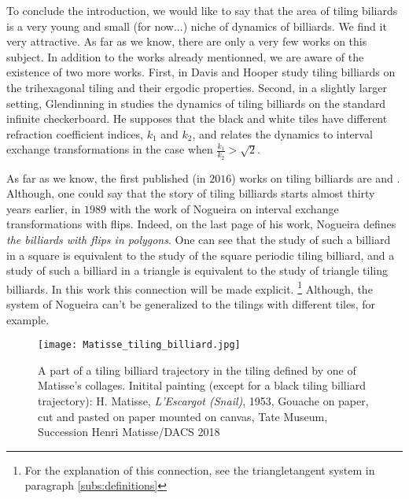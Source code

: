 \documentclass[12pt]{article}
\theoremstyle{definition}
\begin{document}
To conclude the introduction, we would like to say that the area of tiling biliards is a very young and small (for now...) niche of dynamics of billiards. We find it very attractive.
As far as we know, there are only a very few works on this subject. In addition to the works already mentionned, we are aware of the existence of two more works. First, in \cite{DH18} Davis and Hooper study tiling billiards on the trihexagonal tiling and their ergodic properties. Second, in a slightly larger setting, Glendinning in \cite{G16} studies the dynamics of tiling billiards on the standard infinite checkerboard. He supposes that the black and white tiles have different refraction coefficient indices, $k_1$ and $k_2$, and relates the dynamics to interval exchange transformations in the case when $\frac{k_1}{k_2}>\sqrt{2}$. 

As far as we know, the first published (in $2016$) works on tiling billiards are \cite{DDRSL16} and \cite{G16}. Although, one could say that the story of tiling billiards starts almost thirty years earlier, in $1989$ with the work of Nogueira \cite{N89} on interval exchange transformations with flips. Indeed, on the last page of his work, Nogueira defines \emph{the billiards with flips in polygons}. One can see that the study of such a billiard in a square is equivalent to the study of the square periodic tiling billiard, and a study of such a billiard in a triangle is equivalent to the study of triangle tiling billiards. In this work this connection will be made explicit. \footnote{For the explanation of this connection, see the triangletangent system in paragraph \ref{subs:definitions}} Although, the system of Nogueira can't be generalized to the tilings with different tiles, for example.

\begin{figure}
\texttt{[image: Matisse\_tiling\_billiard.jpg]}
\centering
\caption[]{A part of a tiling billiard trajectory in the tiling defined by one of Matisse's collages. 
Initital painting (except for a black tiling billiard trajectory): H. Matisse, \emph{L'Escargot (Snail)}, 1953,  Gouache on paper, cut and pasted on paper mounted on canvas, Tate Museum, Succession Henri Matisse/DACS 2018}\label{fig:Matisse}
\end{figure}
\end{document}
